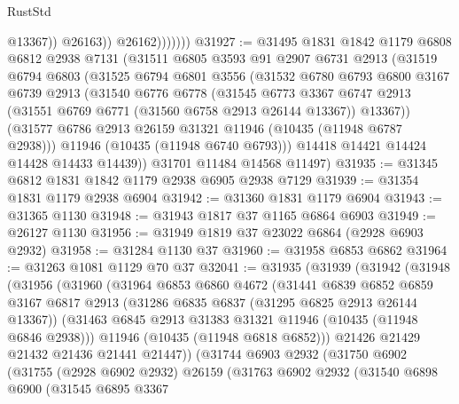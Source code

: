 \begin{lexlean}{RustStd}
\begin{coremodule}
                          @13367))
                      @26163))
                  @26162)))))))
@31927 := @31495
    @1831
    @1842
    @1179
    @6808
    @6812
    @2938
    @7131
    (@31511
      @6805
      @3593
      @91
      @2907
      @6731
      @2913
      (@31519
        @6794
        @6803
        (@31525
          @6794
          @6801
          @3556
          (@31532
            @6780
            @6793
            @6800
            @3167
            @6739
            @2913
            (@31540
              @6776
              @6778
              (@31545
                @6773
                @3367
                @6747
                @2913
                (@31551 @6769 @6771 (@31560 @6758 @2913 @26144 @13367))
                @13367))
            (@31577 @6786 @2913 @26159 @31321 @11946 (@10435 (@11948 @6787 @2938)))
            @11946
            (@10435 (@11948 @6740 @6793)))
          @14418
          @14421
          @14424
          @14428
          @14433
          @14439))
      @31701
      @11484
      @14568
      @11497)
@31935 := @31345 @6812 @1831 @1842 @1179 @2938 @6905 @2938 @7129
@31939 := @31354 @1831 @1179 @2938 @6904
@31942 := @31360 @1831 @1179 @6904
@31943 := @31365 @1130
@31948 := @31943 @1817 @37 @1165 @6864 @6903
@31949 := @26127 @1130
@31956 := @31949 @1819 @37 @23022 @6864 (@2928 @6903 @2932)
@31958 := @31284 @1130 @37
@31960 := @31958 @6853 @6862
@31964 := @31263 @1081 @1129 @70 @37
@32041 := @31935
    (@31939
      (@31942
        (@31948
          (@31956
            (@31960
              (@31964
                @6853
                @6860
                @4672
                (@31441
                  @6839
                  @6852
                  @6859
                  @3167
                  @6817
                  @2913
                  (@31286 @6835 @6837 (@31295 @6825 @2913 @26144 @13367))
                  (@31463 @6845 @2913 @31383 @31321 @11946 (@10435 (@11948 @6846 @2938)))
                  @11946
                  (@10435 (@11948 @6818 @6852)))
                @21426
                @21429
                @21432
                @21436
                @21441
                @21447))
            (@31744
              @6903
              @2932
              (@31750
                @6902
                (@31755
                  (@2928 @6902 @2932)
                  @26159
                  (@31763
                    @6902
                    @2932
                    (@31540
                      @6898
                      @6900
                      (@31545
                        @6895
                        @3367

\end{coremodule}
\end{lexlean}
